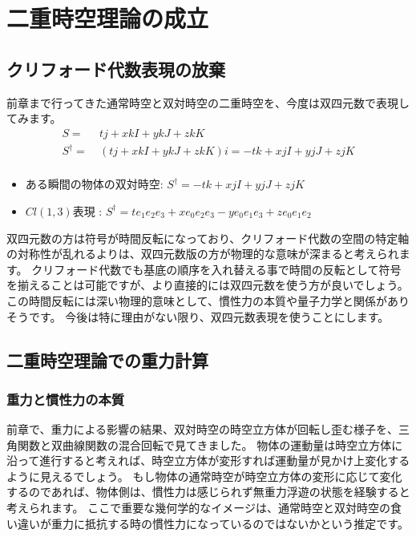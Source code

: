 \documentclass[a4paper,12pt,notitlepage]{jsreport}
\begin{document}
\chapter{二重時空理論の成立}

\section{クリフォード代数表現の放棄}

前章まで行ってきた通常時空と双対時空の二重時空を、今度は双四元数で表現してみます。
\begin{equation}
  \begin{split}
    S = ~ & t j + x kI + y kJ + z kK \\
    S^\dag = ~ & (t j + x kI + y kJ + z kK)i = - t k + x jI + y jJ + z jK \\
  \end{split}
\end{equation}
\begin{itemize}
  \item ある瞬間の物体の双対時空: $ S^\dag = - t k + x jI + y jJ + z jK $
  \item $ Cl(1,3) $表現 : $ S^\dag = t e_1e_2e_3 + x e_0e_2e_3 - y e_0e_1e_3 + z e_0e_1e_2 $
\end{itemize}
双四元数の方は符号が時間反転になっており、クリフォード代数の空間の特定軸の対称性が乱れるよりは、双四元数版の方が物理的な意味が深まると考えられます。
クリフォード代数でも基底の順序を入れ替える事で時間の反転として符号を揃えることは可能ですが、より直接的には双四元数を使う方が良いでしょう。
この時間反転には深い物理的意味として、慣性力の本質や量子力学と関係がありそうです。
今後は特に理由がない限り、双四元数表現を使うことにします。

\section{二重時空理論での重力計算}

\subsection{重力と慣性力の本質}

前章で、重力による影響の結果、双対時空の時空立方体が回転し歪む様子を、三角関数と双曲線関数の混合回転で見てきました。
物体の運動量は時空立方体に沿って進行すると考えれば、時空立方体が変形すれば運動量が見かけ上変化するように見えるでしょう。
もし物体の通常時空が時空立方体の変形に応じて変化するのであれば、物体側は、慣性力は感じられず無重力浮遊の状態を経験すると考えられます。
ここで重要な幾何学的なイメージは、通常時空と双対時空の食い違いが重力に抵抗する時の慣性力になっているのではないかという推定です。
\end{document}
